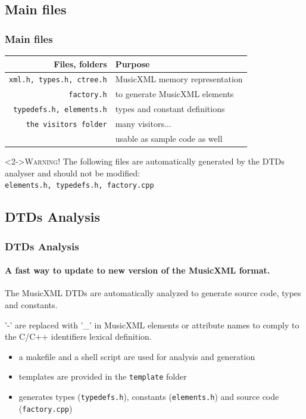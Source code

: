 \documentclass{paper}
\begin{document}
\subsection{Main files}
\begin{frame}
	\frametitle{Main files}

	{\small
	\begin{center}
	\begin{tabular}{|r|l|}
	\hline
	\textbf{Files, folders} & \textbf{Purpose} \\
	\hline
	\texttt{xml.h, types.h, ctree.h} & MusicXML memory representation \\
	\hline
	\texttt{factory.h} & to generate MusicXML elements \\
	\hline
	\texttt{typedefs.h, elements.h} & types and constant definitions \\
	\hline
	\texttt{the visitors folder} & many visitors... \\
	  & usable as sample code as well \\
	\hline
	\end{tabular}
	\end{center}
	}

\begin{block}<2->{\alert{\textsc{Warning!}}}
The following files are automatically generated by the DTDs analyser and should not be modified:\\
\hspace{15mm} \texttt{elements.h, typedefs.h, factory.cpp} \\
\end{block}
\end{frame}


\subsection{DTDs Analysis}
\begin{frame}
	\frametitle{DTDs Analysis}
	\framesubtitle{A fast way to update to new version of the MusicXML format.}

	The MusicXML DTDs are automatically analyzed to generate source code, types and constants.
\begin{block}{}
'-' are replaced with '\_' in MusicXML elements or attribute names to comply to the C/C++
identifiers lexical definition.
\end{block}

	\begin{itemize}
	\item a makefile and a shell script are used for analysis and generation
	\item templates are provided in the \texttt{template} folder
	\item generates types (\texttt{typedefs.h}), constants  (\texttt{elements.h})
	and source code (\texttt{factory.cpp})
	\end{itemize}



\end{frame}
\end{document}
